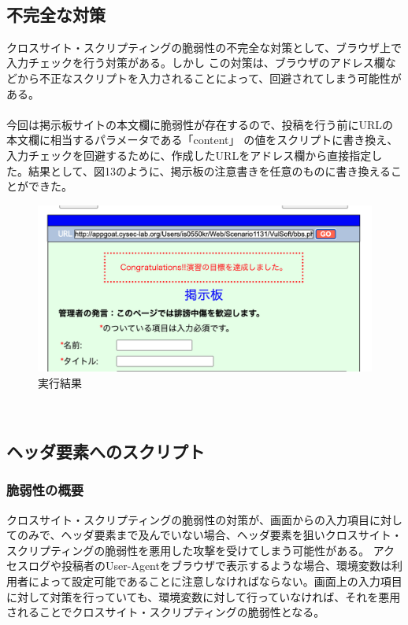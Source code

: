 \documentclass[dvipdfmx,autodetect-engine,titlepage]{jsarticle}
\begin{document}
　\\
\subsection{不完全な対策}
クロスサイト・スクリプティングの脆弱性の不完全な対策として、ブラウザ上で入力チェックを行う対策がある。しかし
この対策は、ブラウザのアドレス欄などから不正なスクリプトを入力されることによって、回避されてしまう可能性がある。\\\\
今回は掲示板サイトの本文欄に脆弱性が存在するので、投稿を行う前にURLの本文欄に相当するパラメータである「content」
の値をスクリプトに書き換え、入力チェックを回避するために、作成したURLをアドレス欄から直接指定した。結果として、図13のように、掲示板の注意書きを任意のものに書き換えることができた。\\

\begin{figure}[H]
  \centering
  \includegraphics[scale=0.36]{web13.png}
  \caption{実行結果}\label{fig:図13}
\end{figure}

　\\
\subsection{ヘッダ要素へのスクリプト}
\subsubsection{脆弱性の概要}
クロスサイト・スクリプティングの脆弱性の対策が、画面からの入力項目に対してのみで、ヘッダ要素まで及んでいない場合、ヘッダ要素を狙いクロスサイト・スクリプティングの脆弱性を悪用した攻撃を受けてしまう可能性がある。
アクセスログや投稿者のUser-Agentをブラウザで表示するような場合、環境変数は利用者によって設定可能であることに注意しなければならない。画面上の入力項目に対して対策を行っていても、環境変数に対して行っていなければ、それを悪用されることでクロスサイト・スクリプティングの脆弱性となる。\\
\end{document}
